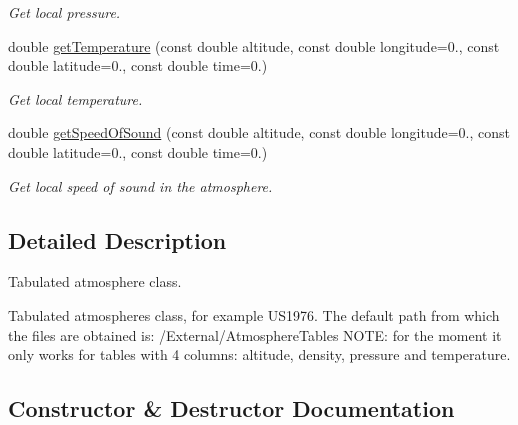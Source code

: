 \begin{DoxyCompactItemize}
\begin{DoxyCompactList}\small\item\em Get local pressure. \end{DoxyCompactList}\item 
double \hyperlink{classtudat_1_1aerodynamics_1_1TabulatedAtmosphere_afdf6a072bd4c4d876ba2323f5955b441}{get\+Temperature} (const double altitude, const double longitude=0., const double latitude=0., const double time=0.)
\begin{DoxyCompactList}\small\item\em Get local temperature. \end{DoxyCompactList}\item 
double \hyperlink{classtudat_1_1aerodynamics_1_1TabulatedAtmosphere_ae644bf870445c03d007984d946ceaee4}{get\+Speed\+Of\+Sound} (const double altitude, const double longitude=0., const double latitude=0., const double time=0.)
\begin{DoxyCompactList}\small\item\em Get local speed of sound in the atmosphere. \end{DoxyCompactList}\end{DoxyCompactItemize}


\subsection{Detailed Description}
Tabulated atmosphere class. 

Tabulated atmospheres class, for example U\+S1976. The default path from which the files are obtained is\+: /\+External/\+Atmosphere\+Tables N\+O\+TE\+: for the moment it only works for tables with 4 columns\+: altitude, density, pressure and temperature. 

\subsection{Constructor \& Destructor Documentation}
